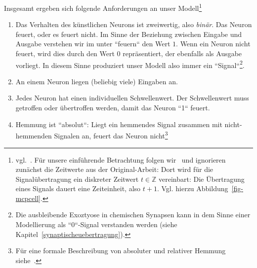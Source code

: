 Insgesamt ergeben sich folgende Anforderungen an unser Modell\footnote{
    vgl.~\cite[26 f.]{Fau94}. Für unsere einführende Betrachtung folgen wir~\cite[33 f.]{Roj93} und ignorieren zunächst die Zeitwerte aus der Original-Arbeit: Dort wird für die Signalübertragung ein diskreter Zeitwert $t \in \mathbb{Z}$ vereinbart: Die Übertragung eines Signals dauert eine Zeiteinheit, also $t + 1$. Vgl. hierzu Abbildung~\ref{fig-mcpcell}.
}
\begin{enumerate}
    \item Das Verhalten des künstlichen Neurons ist zweiwertig, also \textit{binär}. Das Neuron feuert, oder es feuert nicht. Im Sinne der Beziehung zwischen Eingabe und Ausgabe verstehen wir im unter ``feuern`` den Wert $1$. Wenn ein Neuron nicht feuert, wird dies durch den Wert $0$ repräsentiert, der ebenfalls als Ausgabe vorliegt. In diesem Sinne produziert unser Modell also immer ein ``Signal``\footnote{
        Die ausbleibende Exoztyose in chemischen Synapsen kann in dem Sinne einer Modellierung als ``0``-Signal verstanden werden (siehe Kapitel~\ref{synaptischeuebertragung}).
    }.
    \item An einem Neuron liegen (beliebig viele) Eingaben an.
    \item Jedes Neuron hat einen individuellen Schwellenwert. Der Schwellenwert muss getroffen oder übertroffen werden, damit das Neuron ``1`` feuert.
    \item Hemmung ist ``absolut``: Liegt ein hemmendes Signal zusammen mit nicht-hemmenden Signalen an, feuert das Neuron nicht\footnote{
        Für eine formale Beschreibung von absoluter und relativer Hemmung siehe~\cite[42 f.]{Roj93}.
    }
\end{enumerate}


